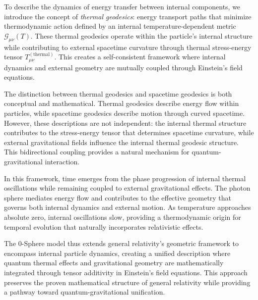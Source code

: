 \documentclass[%
 reprint,
 amsmath,amssymb,
 aps,
]{revtex4-1}
\numberwithin{equation}{section}%
\begin{document}
To describe the dynamics of energy transfer between internal components, we introduce the concept of \textit{thermal geodesics}: energy transport paths that minimize thermodynamic action defined by an internal temperature-dependent metric $\mathcal{G}_{\mu\nu}(T)$. These thermal geodesics operate within the particle's internal structure while contributing to external spacetime curvature through thermal stress-energy tensor $T_{\mu\nu}^{(\text{thermal})}$. This creates a self-consistent framework where internal dynamics and external geometry are mutually coupled through Einstein's field equations.

The distinction between thermal geodesics and spacetime geodesics is both conceptual and mathematical. Thermal geodesics describe energy flow within particles, while spacetime geodesics describe motion through curved spacetime. However, these descriptions are not independent: the internal thermal structure contributes to the stress-energy tensor that determines spacetime curvature, while external gravitational fields influence the internal thermal geodesic structure. This bidirectional coupling provides a natural mechanism for quantum-gravitational interaction.

In this framework, time emerges from the phase progression of internal thermal oscillations while remaining coupled to external gravitational effects. The photon sphere mediates energy flow and contributes to the effective geometry that governs both internal dynamics and external motion. As temperature approaches absolute zero, internal oscillations slow, providing a thermodynamic origin for temporal evolution that naturally incorporates relativistic effects.

The 0-Sphere model thus extends general relativity's geometric framework to encompass internal particle dynamics, creating a unified description where quantum thermal effects and gravitational geometry are mathematically integrated through tensor additivity in Einstein's field equations. This approach preserves the proven mathematical structure of general relativity while providing a pathway toward quantum-gravitational unification.
\end{document}
